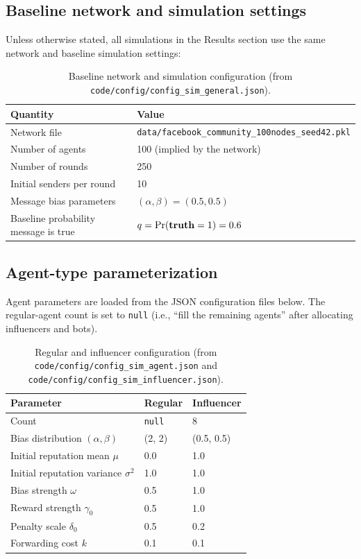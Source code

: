 \subsection{Baseline network and simulation settings}

Unless otherwise stated, all simulations in the Results section use the same network and baseline simulation settings:

\begin{table}[H]
\centering
\begin{tabular}{ll}
\hline
\textbf{Quantity} & \textbf{Value} \\
\hline
Network file & \texttt{data/facebook\_community\_100nodes\_seed42.pkl} \\
Number of agents & 100 (implied by the network) \\
Number of rounds & 250 \\
Initial senders per round & 10 \\
Message bias parameters & $(\alpha,\beta)=(0.5,0.5)$ \\
Baseline probability message is true & $q=\Pr(\mathbf{truth}=1)=0.6$ \\
\hline
\end{tabular}
\caption{Baseline network and simulation configuration (from \texttt{code/config/config\_sim\_general.json}).}
\label{tab:baseline_sim_config}
\end{table}

\subsection{Agent-type parameterization}

Agent parameters are loaded from the JSON configuration files below. The regular-agent count is set to \texttt{null} (i.e., ``fill the remaining agents'' after allocating influencers and bots).

\begin{table}[H]
\centering
\begin{tabular}{lll}
\hline
\textbf{Parameter} & \textbf{Regular} & \textbf{Influencer} \\
\hline
Count & \texttt{null} & 8 \\
Bias distribution $(\alpha,\beta)$ & (2, 2) & (0.5, 0.5) \\
Initial reputation mean $\mu$ & 0.0 & 1.0 \\
Initial reputation variance $\sigma^2$ & 1.0 & 1.0 \\
Bias strength $\omega$ & 0.5 & 1.0 \\
Reward strength $\gamma_0$ & 0.5 & 1.0 \\
Penalty scale $\delta_0$ & 0.5 & 0.2 \\
Forwarding cost $k$ & 0.1 & 0.1 \\
\hline
\end{tabular}
\caption{Regular and influencer configuration (from \texttt{code/config/config\_sim\_agent.json} and \texttt{code/config/config\_sim\_influencer.json}).}
\label{tab:agent_influencer_params}
\end{table}

